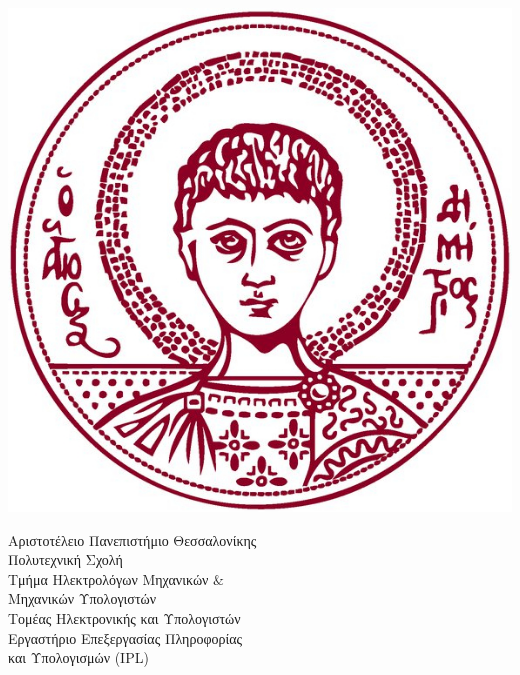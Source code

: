 \begin{titlepage}

  \begin{minipage}{0.3\textwidth}
    \begin{flushleft}
      \includegraphics[scale=0.25]{./images/title/authLogoTr.jpg}
    \end{flushleft}
  \end{minipage}
  \begin{minipage}{0.9\textwidth}
    \begin{flushleft}
      \large Αριστοτέλειο Πανεπιστήμιο Θεσσαλονίκης \\
      Πολυτεχνική Σχολή \\
      Τμήμα Ηλεκτρολόγων Μηχανικών $\&$ \\ Μηχανικών Υπολογιστών\\
      \vspace{1mm}
      \normalsize{Τομέας Ηλεκτρονικής και Υπολογιστών} \\
      \vspace{1mm}
      \normalsize{Εργαστήριο Επεξεργασίας Πληροφορίας \\ και Υπολογισμών (IPL)} \\[5cm] 
    \end{flushleft}
  \end{minipage} \\[1.7cm]





\end{titlepage}
